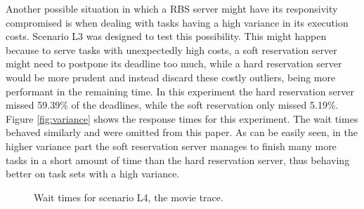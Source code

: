 \documentclass[12pt]{article}
\begin{document}
Another possible situation in which a RBS server might have its
responsivity compromised is when dealing with tasks having a high
variance in its execution costs. Scenario L3 was designed to test this
possibility. This might happen because to serve tasks with
unexpectedly high costs, a soft reservation server might need to
postpone its deadline too much, while a hard reservation server would
be more prudent and instead discard these costly outliers, being more
performant in the remaining time. In this experiment the hard
reservation server missed 59.39\% of the deadlines, while the soft
reservation only missed 5.19\%. Figure \ref{fig:variance} shows the
response times for this experiment. The wait times behaved similarly
and were omitted from this paper. As can be easily seen, in the
higher variance part the soft reservation server manages to finish
many more tasks in a short amount of time than the hard reservation
server, thus behaving better on task sets with a high variance.

\begin{figure}[t]
  \centering
  \caption{Wait times for scenario L4, the movie trace.}
  \label{fig:eve}
\end{figure}
\end{document}

